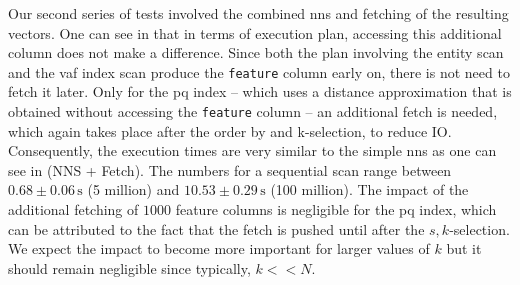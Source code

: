 Our second series of tests involved the combined \acrshort{nns} and fetching of the resulting vectors. One can see in  that in terms of execution plan, accessing this additional column does not make a difference. Since both the plan involving the entity scan and the \acrshort{vaf} index scan produce the \texttt{feature} column early on, there is not need to fetch it later. Only for the \acrshort{pq} index -- which uses a distance approximation that is obtained without accessing the \texttt{feature} column -- an additional fetch is needed, which again takes place after the order by and k-selection, to reduce IO. Consequently, the execution times are very similar to the simple \acrshort{nns} as one can see in  (NNS + Fetch). The numbers for a sequential scan range between $0.68 \pm 0.06 \, \si{\second}$ (5 million) and $10.53 \pm 0.29 \, \si{\second}$ (100 million). The impact of the additional fetching of $1000$ feature columns is negligible for the \acrshort{pq} index, which can be attributed to the fact that the fetch is pushed until after the $s,k$-selection. We expect the impact to become more important for larger values of $k$ but it should remain negligible since typically, $k << N$.

